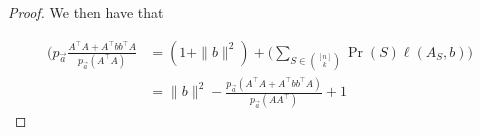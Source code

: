 \begin{proof}
    We then have that

    \begin{align*}
        (p_{\vec{a}}\frac{A^{\intercal}A + A^{\intercal}bb^{\intercal}A}{p_{\vec{a}}(A^{\intercal}A)} &= (1+\|b\|^2) + \big(\sum_{S \in \binom{[n]}{k}}\Pr(S)\ell(A_S,b)\big)\\
                                                                                                      &= \|b\|^2 - 
     \frac{p_{\vec{a}}(A^{\intercal}A + A^{\intercal}bb^{\intercal}A)}{p_{\vec{a}}(AA^{\intercal})} + 1
    \end{align*}
    
\end{proof}

